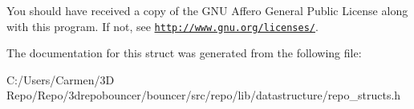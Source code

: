 You should have received a copy of the G\+N\+U Affero General Public License along with this program. If not, see \href{http://www.gnu.org/licenses/}{\tt http\+://www.\+gnu.\+org/licenses/}. 

The documentation for this struct was generated from the following file\+:\begin{DoxyCompactItemize}
\item 
C\+:/\+Users/\+Carmen/3\+D Repo/\+Repo/3drepobouncer/bouncer/src/repo/lib/datastructure/repo\+\_\+structs.\+h\end{DoxyCompactItemize}
